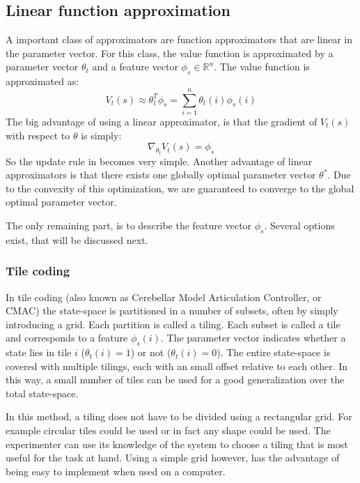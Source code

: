 \documentclass[a4paper,11pt]{mscLiterature}
\begin{document}
	\subsection{Linear function approximation}
	A important class of approximators are function approximators that are linear in the parameter vector. For this class, the value function is approximated by a parameter vector $\theta_t$ and a feature vector $\phi_s \in \mathbb{R}^n$. The value function is approximated as:
	\begin{equation}
		V_t(s) \approx \theta_t^T \phi_s = \sum_{i=1}^n{\theta_t(i)\phi_s(i)}
	\end{equation}
	The big advantage of using a linear approximator, is that the gradient of $V_t(s)$ with respect to $\theta$ is simply:
	\begin{equation}
		\nabla_{\theta_t} V_t(s) = \phi_s
	\end{equation}
	So the update rule in  becomes very simple. Another advantage of linear approximators is that there exists one globally optimal parameter vector $\theta^*$. Due to the convexity of this optimization, we are guaranteed to converge to the global optimal parameter vector.
	
	The only remaining part, is to describe the feature vector $\phi_s$. Several options exist, that will be discussed next.
	
	\subsubsection{Tile coding}
	In tile coding (also known as Cerebellar Model Articulation Controller, or CMAC) the state-space is partitioned in a number of subsets, often by simply introducing a grid. Each partition is called a tiling. Each subset is called a tile and corresponds to a feature $\phi_s(i)$. The parameter vector indicates whether a state lies in tile $i$ ($\theta_t(i) = 1$) or not ($\theta_t(i) = 0$). The entire state-space is covered with multiple tilings, each with an small offset relative to each other. In this way, a small number of tiles can be used for a good generalization over the total state-space. 
	
	In this method, a tiling does not have to be divided using a rectangular grid. For example circular tiles could be used or in fact any shape could be used. The experimenter can use its knowledge of the system to choose a tiling that is most useful for the task at hand. Using a simple grid however, has the advantage of being easy to implement when used on a computer. 
	
\end{document}
